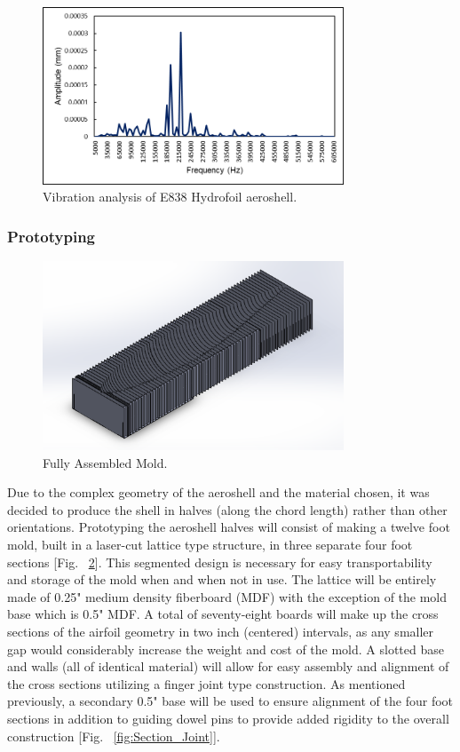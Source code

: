 \begin{figure}[H]
  \centering
  \includegraphics[width=0.8\textwidth]{Aeroshell/vibration.png}
  \caption{\label{fig:vibration}Vibration analysis of E838 Hydrofoil aeroshell.}
\end{figure}

\subsubsection*{Prototyping}

\begin{figure}[ht]
\centering
\includegraphics[width=0.8\textwidth]{Aeroshell/completedMold.PNG}
\caption{\label{fig:completedMold} Fully Assembled Mold.}
\end{figure}

\indent\indent Due to the complex geometry of the aeroshell and the material chosen, it was decided to produce the shell in halves (along the chord length) rather than other orientations. Prototyping the aeroshell halves will consist of making a twelve foot mold, built in a laser-cut lattice type structure, in three separate four foot sections [Fig. ~\ref{fig:completedMold}]. This segmented design is necessary for easy transportability and storage of the mold when and when not in use. The lattice will be entirely made of 0.25" medium density fiberboard (MDF) with the exception of the mold base which is 0.5" MDF. A total of seventy-eight boards will make up the cross sections of the airfoil geometry in two inch (centered) intervals, as any smaller gap would considerably increase the weight and cost of the mold. A slotted base and walls (all of identical material) will allow for easy assembly and alignment of the cross sections utilizing a finger joint type construction. As mentioned previously, a secondary 0.5" base will be used to ensure alignment of the four foot sections in addition to guiding dowel pins to provide added rigidity to the overall construction [Fig. ~\ref{fig:Section_Joint}].

